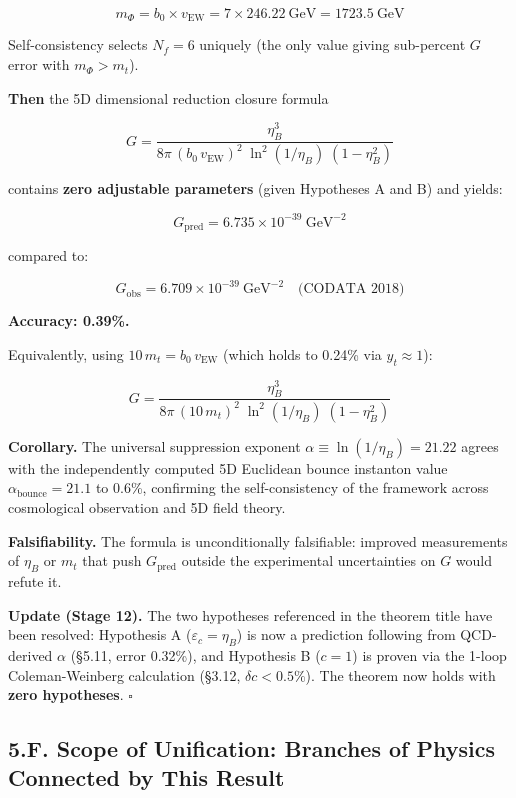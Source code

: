 \documentclass[
  11pt,
]{article}
\begin{document}
\[m_\Phi = b_0 \times v_{\text{EW}} = 7 \times 246.22~\text{GeV} = 1723.5~\text{GeV}\]

Self-consistency selects \(N_f = 6\) uniquely (the only value giving
sub-percent \(G\) error with \(m_\Phi > m_t\)).

\textbf{Then} the 5D dimensional reduction closure formula

\[\boxed{G = \frac{\eta_B^3}{8\pi\,(b_0\,v_{\text{EW}})^2\;\ln^2(1/\eta_B)\;(1 - \eta_B^2)}}\]

contains \textbf{zero adjustable parameters} (given Hypotheses A and B)
and yields:

\[G_{\text{pred}} = 6.735 \times 10^{-39}~\text{GeV}^{-2}\]

compared to:

\[G_{\text{obs}} = 6.709 \times 10^{-39}~\text{GeV}^{-2} \quad \text{(CODATA 2018)}\]

\textbf{Accuracy: 0.39\%.}

Equivalently, using \(10\,m_t = b_0\,v_{\text{EW}}\) (which holds to
0.24\% via \(y_t \approx 1\)):

\[\boxed{G = \frac{\eta_B^3}{8\pi\,(10\,m_t)^2\;\ln^2(1/\eta_B)\;(1 - \eta_B^2)}}\]

\textbf{Corollary.} The universal suppression exponent
\(\alpha \equiv \ln(1/\eta_B) = 21.22\) agrees with the independently
computed 5D Euclidean bounce instanton value
\(\alpha_{\text{bounce}} = 21.1\) to 0.6\%, confirming the
self-consistency of the framework across cosmological observation and 5D
field theory.

\textbf{Falsifiability.} The formula is unconditionally falsifiable:
improved measurements of \(\eta_B\) or \(m_t\) that push
\(G_{\text{pred}}\) outside the experimental uncertainties on \(G\)
would refute it.

\textbf{Update (Stage 12).} The two hypotheses referenced in the theorem
title have been resolved: Hypothesis A (\(\varepsilon_c = \eta_B\)) is
now a prediction following from QCD-derived \(\alpha\) (§5.11, error
0.32\%), and Hypothesis B (\(c = 1\)) is proven via the 1-loop
Coleman-Weinberg calculation (§3.12, \(\delta c < 0.5\%\)). The theorem
now holds with \textbf{zero hypotheses}. \(\square\)

\bigskip

\hypertarget{f.-scope-of-unification-branches-of-physics-connected-by-this-result}{%
\subsection{5.F. Scope of Unification: Branches of Physics Connected by
This
Result}\label{f.-scope-of-unification-branches-of-physics-connected-by-this-result}}
\end{document}
